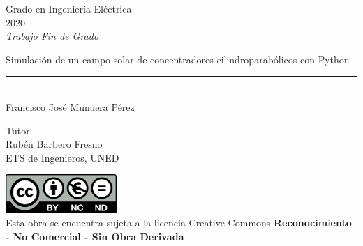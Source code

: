 \documentclass[12pt]{report} %
\begin{document}
	
	\begin{titlepage}
		\begin{sffamily}
			\color{verdeUNED}
			\begin{center}
				\begin{figure}[H] %
				\end{figure}
				\vspace{2.5cm}
				\begin{Large}
					Grado en Ingeniería Eléctrica\\			
					2020\\
					\vspace{2cm}		
					\textsl{Trabajo Fin de Grado}
					\bigskip
					
				\end{Large}
				{\Huge Simulación de un campo solar de concentradores cilindroparabólicos con Python}\\
				\vspace*{0.5cm}
				\rule{10.5cm}{0.1mm}\\
				\vspace*{0.9cm}
				{\LARGE Francisco José Munuera Pérez}\\ 
				\vspace*{1cm}
				\begin{Large}
					Tutor\\
					Rubén Barbero Fresno\\
					ETS de Ingenieros, UNED\\
				\end{Large}
			\end{center}
			\vfill
			\color{black}

			\includegraphics[width=4.2cm]{images/creativecommons.png}\\ %
			Esta obra se encuentra sujeta a la licencia Creative Commons \textbf{Reconocimiento - No Comercial - Sin Obra Derivada}
		\end{sffamily}
	\end{titlepage}
	
\end{document}
